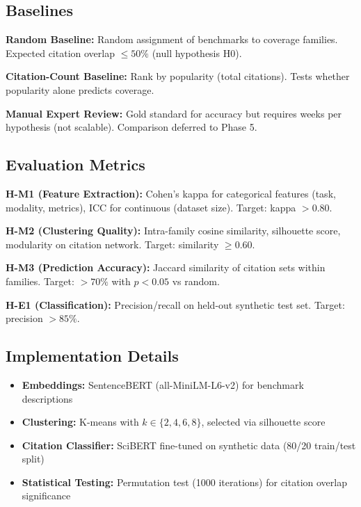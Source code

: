 \subsection{Baselines}

\textbf{Random Baseline:} Random assignment of benchmarks to coverage families. Expected citation overlap $\leq 50\%$ (null hypothesis H0).

\textbf{Citation-Count Baseline:} Rank by popularity (total citations). Tests whether popularity alone predicts coverage.

\textbf{Manual Expert Review:} Gold standard for accuracy but requires weeks per hypothesis (not scalable). Comparison deferred to Phase 5.

\subsection{Evaluation Metrics}

\textbf{H-M1 (Feature Extraction):} Cohen's kappa for categorical features (task, modality, metrics), ICC for continuous (dataset size). Target: kappa $>0.80$.

\textbf{H-M2 (Clustering Quality):} Intra-family cosine similarity, silhouette score, modularity on citation network. Target: similarity $\geq 0.60$.

\textbf{H-M3 (Prediction Accuracy):} Jaccard similarity of citation sets within families. Target: $>70\%$ with $p<0.05$ vs random.

\textbf{H-E1 (Classification):} Precision/recall on held-out synthetic test set. Target: precision $>85\%$.

\subsection{Implementation Details}

\begin{itemize}
\item \textbf{Embeddings:} SentenceBERT (all-MiniLM-L6-v2) for benchmark descriptions
\item \textbf{Clustering:} K-means with $k \in \{2,4,6,8\}$, selected via silhouette score
\item \textbf{Citation Classifier:} SciBERT fine-tuned on synthetic data (80/20 train/test split)
\item \textbf{Statistical Testing:} Permutation test (1000 iterations) for citation overlap significance
\end{itemize}
